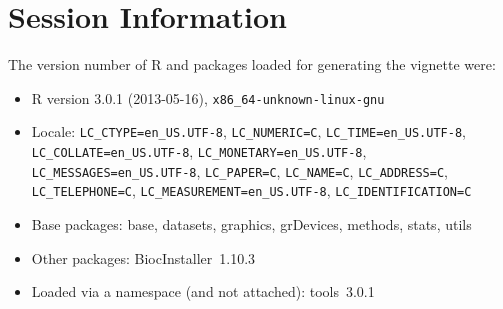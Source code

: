 \documentclass[11pt,a4paper]{article}
\begin{document}


\clearpage

\section*{Session Information}

The version number of R and packages loaded for generating the vignette were:


\begin{itemize}\raggedright
  \item R version 3.0.1 (2013-05-16), \verb|x86_64-unknown-linux-gnu|
  \item Locale: \verb|LC_CTYPE=en_US.UTF-8|, \verb|LC_NUMERIC=C|, \verb|LC_TIME=en_US.UTF-8|, \verb|LC_COLLATE=en_US.UTF-8|, \verb|LC_MONETARY=en_US.UTF-8|, \verb|LC_MESSAGES=en_US.UTF-8|, \verb|LC_PAPER=C|, \verb|LC_NAME=C|, \verb|LC_ADDRESS=C|, \verb|LC_TELEPHONE=C|, \verb|LC_MEASUREMENT=en_US.UTF-8|, \verb|LC_IDENTIFICATION=C|
  \item Base packages: base, datasets, graphics, grDevices, methods,
    stats, utils
  \item Other packages: BiocInstaller~1.10.3
  \item Loaded via a namespace (and not attached): tools~3.0.1
\end{itemize}
\end{document}

